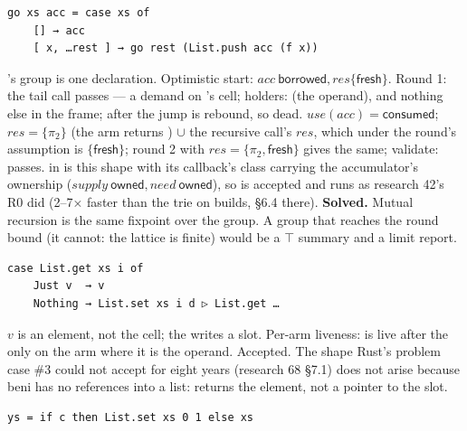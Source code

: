 
\begin{Verbatim}
go xs acc = case xs of
    [] → acc
    [ x, …rest ] → go rest (List.push acc (f x))
\end{Verbatim}

's group is one declaration. Optimistic start: $\mathit{acc}\ \mathsf{borrowed},\allowbreak{}\mathit{res}\{\mathsf{fresh}\}$. Round 1: the tail call passes  — a demand on 's cell; holders:  (the operand), and nothing else in the frame; after the jump  is rebound, so dead. $\mathit{use}(\mathit{acc})=\mathsf{consumed}$; $\mathit{res}=\{\pi _{2}\}$ (the \code{[]} arm returns ) $\cup$ the recursive call's $\mathit{res}$, which under the round's assumption is $\{\mathsf{fresh}\}$; round 2 with $\mathit{res}=\{\pi _{2},\allowbreak{}\mathsf{fresh}\}$ gives the same; validate: passes.  in  is this shape with its callback's class carrying the accumulator's ownership ($\mathit{supply}\ \mathsf{owned},\allowbreak{}\mathit{need}\ \mathsf{owned}$), so  is accepted and runs as research 42's R0 did (2–7× faster than the trie on builds, §6.4 there). \textbf{Solved.} Mutual recursion is the same fixpoint over the group. A group that reaches the round bound (it cannot: the lattice is finite) would be a $\top$ summary and a limit report.


\begin{Verbatim}
case List.get xs i of
    Just v  → v
    Nothing → List.set xs i d ▷ List.get … 
\end{Verbatim}

$v$ is an element, not the cell; the  writes a slot. Per-arm liveness:  is live after the  only on the  arm where it is the operand. Accepted. The shape Rust's problem case \#3 could not accept for eight years (research 68 §7.1) does not arise because beni has no references into a list:  returns the element, not a pointer to the slot.

\begin{Verbatim}
ys = if c then List.set xs 0 1 else xs
\end{Verbatim}

